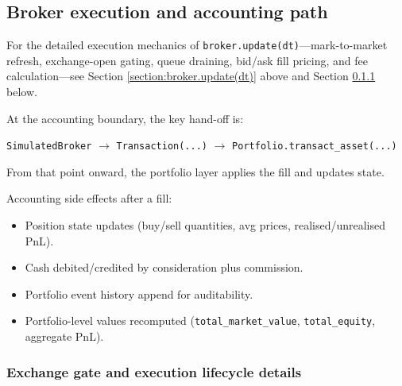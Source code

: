 \documentclass[11pt]{article}
\begin{document}
\subsection{Broker execution and accounting path}

For the detailed execution mechanics of \texttt{broker.update(dt)}---mark-to-market refresh, exchange-open gating, queue draining, bid/ask fill pricing, and fee calculation---see Section \ref{section:broker.update(dt)} above and Section \ref{section:exec_lifecycle} below.

At the accounting boundary, the key hand-off is:

\begin{center}
\texttt{SimulatedBroker} $\rightarrow$ \texttt{Transaction(...)} $\rightarrow$ \texttt{Portfolio.transact\_asset(...)}
\end{center}

From that point onward, the portfolio layer applies the fill and updates state.

Accounting side effects after a fill:

\begin{itemize}[leftmargin=*]
  \item Position state updates (buy/sell quantities, avg prices, realised/unrealised PnL).
  \item Cash debited/credited by consideration plus commission.
  \item Portfolio event history append for auditability.
  \item Portfolio-level values recomputed (\texttt{total\_market\_value}, \texttt{total\_equity}, aggregate PnL).
\end{itemize}

\subsubsection{Exchange gate and execution lifecycle details}\label{section:exec_lifecycle}
\end{document}
